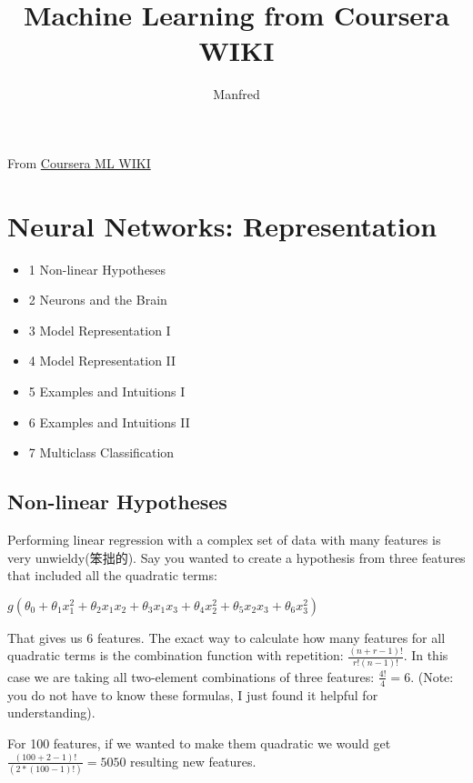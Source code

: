 \documentclass{article}
\author{Manfred}
\title{Machine Learning from Coursera WIKI}
\begin{document}
\maketitle
\newpage

\tableofcontents
\newpage

\listoftables
\newpage

\listoffigures
\newpage

From \href{https://share.coursera.org/wiki/index.php/ML:Main}{Coursera ML WIKI}

\section{Neural Networks: Representation}

\begin{itemize}

\item    1 Non-linear Hypotheses
\item    2 Neurons and the Brain
\item    3 Model Representation I
\item    4 Model Representation II
\item    5 Examples and Intuitions I
\item    6 Examples and Intuitions II
\item    7 Multiclass Classification
\end{itemize}
\subsection{Non-linear Hypotheses}

Performing linear regression with a complex set of data with many features is very unwieldy(笨拙的). Say you wanted to create a hypothesis from three features that included all the quadratic terms:

$g(\theta_0+\theta_1x_1^2+\theta_2x_1x_2+\theta_3x_1x_3+\theta_4x_2^2+\theta_5x_2x_3+\theta_6x_3^2)$

That gives us 6 features. The exact way to calculate how many features for all quadratic terms is the combination function with repetition: $\frac{(n+r−1)!}{r!(n−1)!}$. In this case we are taking all two-element combinations of three features: $\frac{4!}{4}=6$. (Note: you do not have to know these formulas, I just found it helpful for understanding).

For 100 features, if we wanted to make them quadratic we would get $\frac{(100+2−1)!}{(2*(100−1)!)}=5050$ resulting new features.
\end{document}
